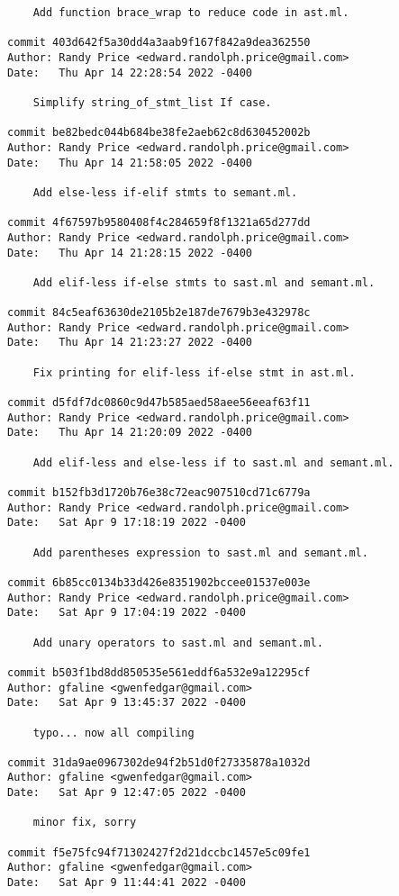 {\begin{verbatim}
    Add function brace_wrap to reduce code in ast.ml.

commit 403d642f5a30dd4a3aab9f167f842a9dea362550
Author: Randy Price <edward.randolph.price@gmail.com>
Date:   Thu Apr 14 22:28:54 2022 -0400

    Simplify string_of_stmt_list If case.

commit be82bedc044b684be38fe2aeb62c8d630452002b
Author: Randy Price <edward.randolph.price@gmail.com>
Date:   Thu Apr 14 21:58:05 2022 -0400

    Add else-less if-elif stmts to semant.ml.

commit 4f67597b9580408f4c284659f8f1321a65d277dd
Author: Randy Price <edward.randolph.price@gmail.com>
Date:   Thu Apr 14 21:28:15 2022 -0400

    Add elif-less if-else stmts to sast.ml and semant.ml.

commit 84c5eaf63630de2105b2e187de7679b3e432978c
Author: Randy Price <edward.randolph.price@gmail.com>
Date:   Thu Apr 14 21:23:27 2022 -0400

    Fix printing for elif-less if-else stmt in ast.ml.

commit d5fdf7dc0860c9d47b585aed58aee56eeaf63f11
Author: Randy Price <edward.randolph.price@gmail.com>
Date:   Thu Apr 14 21:20:09 2022 -0400

    Add elif-less and else-less if to sast.ml and semant.ml.

commit b152fb3d1720b76e38c72eac907510cd71c6779a
Author: Randy Price <edward.randolph.price@gmail.com>
Date:   Sat Apr 9 17:18:19 2022 -0400

    Add parentheses expression to sast.ml and semant.ml.

commit 6b85cc0134b33d426e8351902bccee01537e003e
Author: Randy Price <edward.randolph.price@gmail.com>
Date:   Sat Apr 9 17:04:19 2022 -0400

    Add unary operators to sast.ml and semant.ml.

commit b503f1bd8dd850535e561eddf6a532e9a12295cf
Author: gfaline <gwenfedgar@gmail.com>
Date:   Sat Apr 9 13:45:37 2022 -0400

    typo... now all compiling

commit 31da9ae0967302de94f2b51d0f27335878a1032d
Author: gfaline <gwenfedgar@gmail.com>
Date:   Sat Apr 9 12:47:05 2022 -0400

    minor fix, sorry

commit f5e75fc94f71302427f2d21dccbc1457e5c09fe1
Author: gfaline <gwenfedgar@gmail.com>
Date:   Sat Apr 9 11:44:41 2022 -0400


\end{verbatim}}
